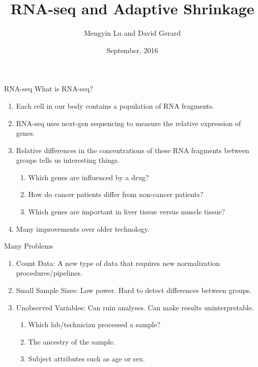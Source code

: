 \documentclass[evncountsect]{beamer}
\title{RNA-seq and Adaptive Shrinkage}
\author{Mengyin Lu and David Gerard}
\institute[UChicago]{
  Department of Human Genetics\\
  University of Chicago\\
  Boss: Matthew Stephens
}
\date[September 2016]{September, 2016}
\begin{document}
\begin{frame}
  \titlepage
\end{frame}

\begin{frame}{RNA-seq}
  What is RNA-seq?
  \begin{enumerate}
  \item Each cell in our body contains a population of RNA fragments.
  \item RNA-seq uses next-gen sequencing to measure the relative expression of genes.
  \item Relative differences in the concentrations of these RNA fragments between groups tells us interesting things. 
    \begin{enumerate}
    \item Which genes are influenced by a drug?
    \item How do cancer patients differ from non-cancer patients?
    \item Which genes are important in liver tissue versus muscle tissue?
    \end{enumerate}
  \item Many improvements over older technology.
  \end{enumerate}

\end{frame}


\begin{frame}{Many Problems}
  \begin{enumerate}
  \item Count Data: A new type of data that requires new normalization
    procedures/pipelines.
  \item Small Sample Sizes: Low power. Hard to detect differences between groups.
  \item Unobserved Variables: Can ruin analyses. Can make results uninterpretable.
    \begin{enumerate}
    \item Which lab/technician processed a sample?
    \item The ancestry of the sample.
    \item Subject attributes such as age or sex.
    \end{enumerate}
  \end{enumerate}
\end{frame}
\end{document}
